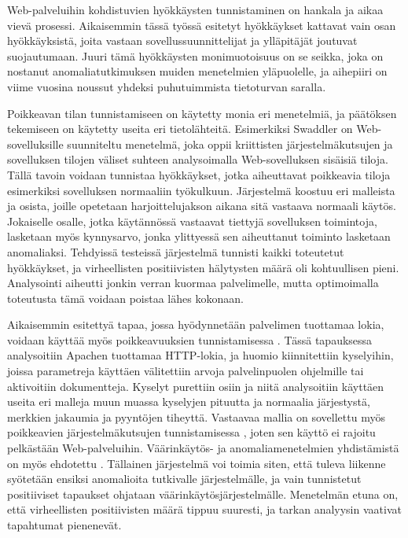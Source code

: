 Web-palveluihin kohdistuvien hyökkäysten tunnistaminen on hankala ja aikaa vievä prosessi. Aikaisemmin tässä työssä esitetyt hyökkäykset kattavat vain osan hyökkäyksistä, joita vastaan sovellussuunnittelijat ja
ylläpitäjät joutuvat suojautumaan. Juuri tämä hyökkäysten monimuotoisuus on se seikka, joka on nostanut anomaliatutkimuksen muiden menetelmien yläpuolelle, ja aihepiiri on viime vuosina noussut yhdeksi 
puhutuimmista tietoturvan saralla. 

Poikkeavan tilan tunnistamiseen on käytetty monia eri menetelmiä, ja päätöksen tekemiseen on käytetty useita eri tietolähteitä. Esimerkiksi Swaddler \cite{Swaddler} on 
Web-sovelluksille suunniteltu menetelmä, joka oppii kriittisten järjestelmäkutsujen ja sovelluksen tilojen väliset suhteen analysoimalla Web-sovelluksen sisäisiä tiloja. Tällä tavoin voidaan tunnistaa hyökkäykset,
jotka aiheuttavat poikkeavia tiloja esimerkiksi sovelluksen normaaliin työkulkuun. Järjestelmä koostuu eri malleista ja osista, joille opetetaan harjoittelujakson aikana sitä vastaava normaali käytös. Jokaiselle
osalle, jotka käytännössä vastaavat tiettyjä sovelluksen toimintoja, lasketaan myös kynnysarvo, jonka ylittyessä sen aiheuttanut toiminto lasketaan anomaliaksi. Tehdyissä testeissä järjestelmä tunnisti 
kaikki toteutetut hyökkäykset, ja virheellisten positiivisten hälytysten määrä oli kohtuullisen pieni. Analysointi aiheutti jonkin verran kuormaa palvelimelle, mutta optimoimalla toteutusta tämä voidaan poistaa
lähes kokonaan. 

Aikaisemmin esitettyä tapaa, jossa hyödynnetään palvelimen tuottamaa lokia, voidaan käyttää myös poikkeavuuksien tunnistamisessa \cite{Multi}. Tässä tapauksessa analysoitiin Apachen tuottamaa HTTP-lokia, ja huomio
kiinnitettiin kyselyihin, joissa parametreja käyttäen välitettiin arvoja palvelinpuolen ohjelmille tai aktivoitiin dokumentteja. Kyselyt purettiin osiin ja niitä analysoitiin käyttäen useita eri malleja 
muun muassa kyselyjen pituutta ja normaalia järjestystä, merkkien jakaumia ja pyyntöjen tiheyttä. Vastaavaa mallia on sovellettu myös poikkeavien järjestelmäkutsujen tunnistamisessa \cite{SystemCall}, joten sen 
käyttö ei rajoitu pelkästään Web-palveluihin. Väärinkäytös- ja anomaliamenetelmien yhdistämistä on myös ehdotettu \cite{Combination}. Tällainen järjestelmä voi toimia siten, että tuleva liikenne syötetään ensiksi 
anomalioita tutkivalle järjestelmälle, ja vain tunnistetut positiiviset tapaukset ohjataan väärinkäytösjärjestelmälle. Menetelmän etuna on, että virheellisten positiivisten määrä tippuu suuresti, ja tarkan 
analyysin vaativat tapahtumat pienenevät.
